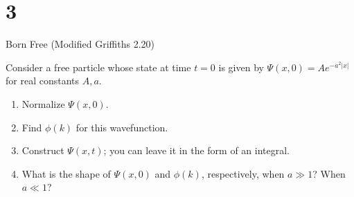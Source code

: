 \documentclass{article}
\begin{document}
\newpage

\section*{3}
\begin{ques}\label{q3}
Born Free (Modified Griffiths 2.20)

Consider a free particle whose state at time $t = 0$ is given by $\Psi(x, 0) = A e^{-a^2 |x|}$ for real constants $A, a$.

\begin{enumerate}
    \item Normalize $\Psi(x, 0)$.
    \item Find $\phi(k)$ for this wavefunction.  
    \item Construct $\Psi(x, t)$; you can leave it in the form of an integral. 
    \item What is the shape of $\Psi(x, 0)$ and $\phi(k)$, respectively, when $a \gg 1$? When $a \ll 1$?
\end{enumerate}
\end{ques}
\end{document}
